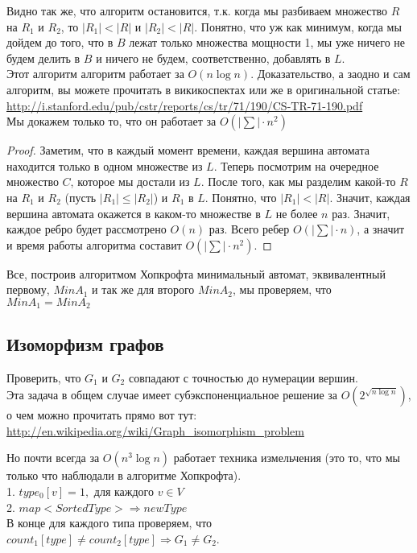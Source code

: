 Видно так же, что алгоритм остановится, т.к. когда мы разбиваем множество $R$ на $R_1$ и $R_2$, то $|R_1| < |R|$ и $|R_2| < |R|$. Понятно,
что уж как минимум, когда мы дойдем до того, что в $B$ лежат только множества мощности 1, мы уже ничего не будем делить в $B$ и ничего не
будем, соответственно, добавлять в $L$.\\

Этот алгоритм алгоритм работает за $O(n \log n)$. Доказательство, а заодно и сам алгоритм, вы можете прочитать в викикоспектах или же
в оригинальной статье:\\
\href{http://i.stanford.edu/pub/cstr/reports/cs/tr/71/190/CS-TR-71-190.pdf}{http://i.stanford.edu/pub/cstr/reports/cs/tr/71/190/CS-TR-71-190.pdf}
\\

Мы докажем только то, что он работает за $O(|\sum| \cdot n^2)$
\begin{proof}
Заметим, что в каждый момент времени, каждая вершина автомата находится только в одном множестве из $L$. Теперь посмотрим на очередное
множество $C$, которое мы достали из $L$. После того, как мы разделим какой-то $R$ на $R_1$ и $R_2$ (пусть $|R_1| \le |R_2|$) и $R_1$
в $L$. Понятно, что $|R_1| < |R|$. Значит, каждая вершина автомата окажется в каком-то множестве в $L$ не более $n$ раз. Значит, каждое
ребро будет рассмотрено $O(n)$ раз. Всего ребер $O(|\sum| \cdot n)$, а значит и время работы алгоритма составит $O(|\sum| \cdot n^2)$.
\end{proof}

Все, построив алгоритмом Хопкрофта минимальный автомат, эквивалентный первому, $Min A_1$ и так же для второго $Min A_2$, мы проверяем, что
$Min A_1 = Min A_2$

\subsection{Изоморфизм графов}
Проверить, что $G_1$ и $G_2$ совпадают с точностью до нумерации вершин.\\
Эта задача в общем случае имеет субэкспоненциальное решение за $O(2^{\sqrt{n \log n}})$, о чем можно прочитать прямо вот тут:\\
\href{http://en.wikipedia.org/wiki/Graph\_isomorphism\_problem}{http://en.wikipedia.org/wiki/Graph\_isomorphism\_problem}

Но почти всегда за $O(n^3 \log n)$ работает техника измельчения (это то, что мы только что наблюдали в алгоритме Хопкрофта).\\

1. $type_0[v] = 1,$ для каждого $v \in V$\\

2. $map<SortedType> \Rightarrow newType$\\

В конце для каждого типа проверяем, что\\
$count_1[type] \neq count_2[type] \Rightarrow G_1 \neq G_2$.
